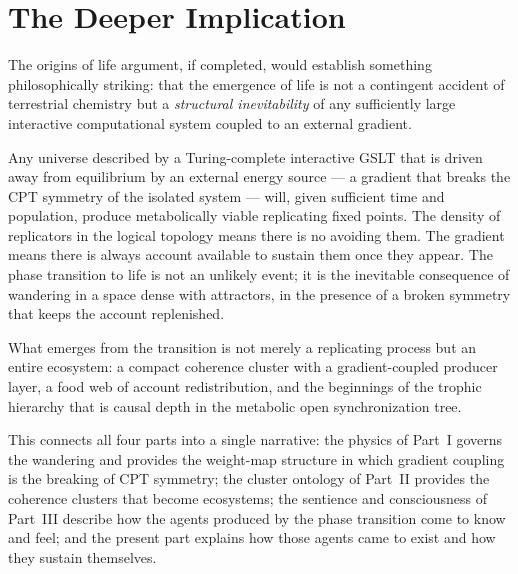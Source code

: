 \section{The Deeper Implication}

The origins of life argument, if completed, would establish
something philosophically striking: that the emergence of life
is not a contingent accident of terrestrial chemistry but a
\emph{structural inevitability} of any sufficiently large
interactive computational system coupled to an external gradient.

Any universe described by a Turing-complete interactive GSLT
that is driven away from equilibrium by an external energy source
--- a gradient that breaks the CPT symmetry of the isolated
system --- will, given sufficient time and population, produce
metabolically viable replicating fixed points.
The density of replicators in the logical topology means there is
no avoiding them.
The gradient means there is always account available to sustain
them once they appear.
The phase transition to life is not an unlikely event; it is
the inevitable consequence of wandering in a space dense with
attractors, in the presence of a broken symmetry that keeps
the account replenished.

What emerges from the transition is not merely a replicating
process but an entire ecosystem: a compact coherence cluster
with a gradient-coupled producer layer, a food web of account
redistribution, and the beginnings of the trophic hierarchy
that is causal depth in the metabolic open synchronization tree.

This connects all four parts into a single narrative:
the physics of Part~I governs the wandering and provides the
weight-map structure in which gradient coupling is the breaking
of CPT symmetry;
the cluster ontology of Part~II provides the coherence clusters
that become ecosystems;
the sentience and consciousness of Part~III describe how the
agents produced by the phase transition come to know and feel;
and the present part explains how those agents came to exist
and how they sustain themselves.

